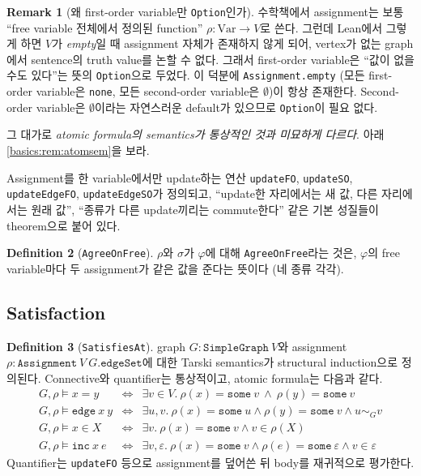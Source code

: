 \documentclass[11pt]{article}
\theoremstyle{definition}
\newtheorem{definition}{Definition}[section]
\newtheorem{remark}[definition]{Remark}
\theoremstyle{plain}
\newcommand{\lean}[1]{\texttt{#1}}
\begin{document}
\begin{remark}[왜 first-order variable만 \lean{Option}인가]
\label{basics:rem:option}
수학책에서 assignment는 보통 ``free variable 전체에서 정의된 function''
$\rho : \mathrm{Var} \to V$로 쓴다. 그런데 Lean에서 그렇게 하면 $V$가
\emph{empty}일 때 assignment 자체가 존재하지 않게 되어, vertex가 없는
graph에서 sentence의 truth value를 논할 수 없다. 그래서 first-order variable은
``값이 없을 수도 있다''는 뜻의 \lean{Option}으로 두었다. 이 덕분에
\lean{Assignment.empty} (모든 first-order variable은 \lean{none}, 모든
second-order variable은 $\emptyset$)이 항상 존재한다. Second-order variable은
$\emptyset$이라는 자연스러운 default가 있으므로 \lean{Option}이 필요 없다.

그 대가로 \emph{atomic formula의 semantics가 통상적인 것과 미묘하게 다르다}.
아래 \ref{basics:rem:atomsem}을 보라.
\end{remark}

Assignment를 한 variable에서만 update하는 연산 \lean{updateFO},
\lean{updateSO}, \lean{updateEdgeFO}, \lean{updateEdgeSO}가 정의되고,
``update한 자리에서는 새 값, 다른 자리에서는 원래 값'', ``종류가 다른
update끼리는 commute한다'' 같은 기본 성질들이 theorem으로 붙어 있다.

\begin{definition}[\lean{AgreeOnFree}]
\label{basics:def:agree}
$\rho$와 $\sigma$가 $\varphi$에 대해 \lean{AgreeOnFree}라는 것은, $\varphi$의
free variable마다 두 assignment가 같은 값을 준다는 뜻이다 (네 종류 각각).
\end{definition}

\subsection{Satisfaction}

\begin{definition}[\lean{SatisfiesAt}]
\label{basics:def:satisfiesat}
graph $G : \lean{SimpleGraph}\ V$와 assignment
$\rho : \lean{Assignment}\ V\ G.\lean{edgeSet}$에 대한 Tarski semantics가
structural induction으로 정의된다. Connective와 quantifier는 통상적이고,
atomic formula는 다음과 같다.
\[
\begin{array}{lcl}
  G, \rho \models x = y &\iff& \exists v \in V.\ \rho(x) = \lean{some}\ v \ \land\ \rho(y) = \lean{some}\ v \\
  G, \rho \models \lean{edge}\ x\ y &\iff& \exists u, v.\ \rho(x) = \lean{some}\ u \land \rho(y) = \lean{some}\ v \land u \sim_G v \\
  G, \rho \models x \in X &\iff& \exists v.\ \rho(x) = \lean{some}\ v \land v \in \rho(X) \\
  G, \rho \models \lean{inc}\ x\ e &\iff& \exists v, \varepsilon.\ \rho(x) = \lean{some}\ v \land \rho(e) = \lean{some}\ \varepsilon \land v \in \varepsilon
\end{array}
\]
Quantifier는 \lean{updateFO} 등으로 assignment를 덮어쓴 뒤 body를 재귀적으로
평가한다.
\end{definition}
\end{document}
